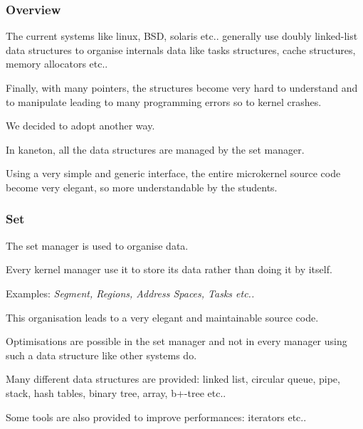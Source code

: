 \documentclass[8pt]{beamer}
\newcommand{\nl}[0]{\vspace{0.4cm}}
\begin{document}
\begin{frame}
  \frametitle{Overview}

  The current systems like linux, BSD, solaris etc.. generally use
  doubly linked-list data structures to organise internals data like
  tasks structures, cache structures, memory allocators etc..

  \nl

  Finally, with many pointers, the structures become very hard to understand
  and to manipulate leading to many programming errors so to kernel
  crashes.

  \nl

  We decided to adopt another way.

  \nl

  In kaneton, all the data structures are managed by the set manager.

  \nl

  Using a very simple and generic interface, the entire microkernel source
  code become very elegant, so more understandable by the students.
\end{frame}


\begin{frame}
  \frametitle{Set}

  The set manager is used to organise data.

  \nl

  Every kernel manager use it to store its data rather than doing it
  by itself.

  \nl

  Examples: \textit{Segment, Regions, Address Spaces, Tasks etc..}

  \nl

  This organisation leads to a very elegant and maintainable source code.

  \nl

  Optimisations are possible in the set manager and not in every
  manager using such a data structure like other systems do.

  \nl

  Many different data structures are provided: linked list, circular
  queue, pipe, stack, hash tables, binary tree, array, b+-tree etc..

  \nl

  Some tools are also provided to improve performances: iterators etc..
\end{frame}

\end{document}
